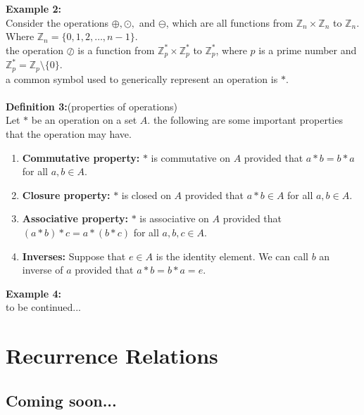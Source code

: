 \documentclass[12pt]{article}
\begin{document}
\vspace{5mm}
\noindent\textbf{Example 2:}
\\Consider the operations $\oplus, \odot,$ and $\ominus$, which are all functions from
$\mathbb{Z}_n \times \mathbb{Z}_n$ to $\mathbb{Z}_n$. Where $\mathbb{Z}_n = \{0,1,2,\dots,n-1\}$.
\\the operation $\oslash$ is a function from $\mathbb{Z}_p^* \times \mathbb{Z}_p^*$ to $\mathbb{Z}_p^*$, 
where $p$ is a prime number and $\mathbb{Z}_p^* = \mathbb{Z}_p \setminus \{0\}$.
\\ a common symbol used to generically represent an operation is $\ast$.
\\
\vspace{5mm}\\
\noindent\textbf{Definition 3:}(properties of operations)
\\
Let $\ast$ be an operation on a set $A$. the following are some important properties that the operation may have.
\begin{enumerate}
    \item \textbf{Commutative property:} $\ast$ is commutative on $A$ provided that $a \ast b = b \ast a$ for all $a,b \in A$.
    \item \textbf{Closure property:} $\ast$ is closed on $A$ provided that $a \ast b \in A$ for all $a,b \in A$.
    \item \textbf{Associative property:} $\ast$ is associative on $A$ provided that $(a \ast b) \ast c = a \ast (b \ast c)$ for all $a,b,c \in A$.
    \item \textbf{Inverses:} Suppose that $e \in A$ is the identity element. We can call $b$ an inverse of $a$ provided that
    $a \ast b = b \ast a = e$.
\end{enumerate}

\vspace{5mm}
\noindent\textbf{Example 4:}
\\ to be continued...







\newpage
\section{Recurrence Relations}
\subsection*{Coming soon...}

\newpage
\end{document}
